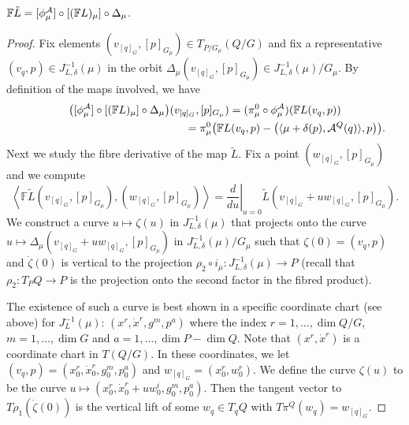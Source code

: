 \documentclass[pdftex]{sigma}
\newcommand{\A}{{\cal A}}
\newcommand{\F}{\mathbb{F}}
\begin{document}
\begin{lemma}\label{lem:legendre}
  $\F \tilde L=[\phi^\A_\mu]\circ[(\F L)_\mu]\circ\Delta_\mu$.
\end{lemma}
\begin{proof}
Fix elements $(v_{[q]_G},[p]_{G_\mu})\in T_{P/G_\mu}(Q/G)$ and f\/ix a representative $(v_q,p)\in J^{-1}_{L,\delta}(\mu)$ in the orbit $\Delta_\mu(v_{[q]_G},[p]_{G_\mu})\in J^{-1}_{L,\delta}(\mu)/G_\mu$. By def\/inition of the maps involved, we have
\begin{gather*}
\big([\phi^\A_\mu]\circ[(\F L)_\mu]\circ\Delta_\mu\big)(v_{[q]_G},[p]_{G_\mu})   = (\pi^0_\mu \circ \phi^\A_\mu)(\F L(v_q,p))\\
 \phantom{\big([\phi^\A_\mu]\circ[(\F L)_\mu]\circ\Delta_\mu\big)(v_{[q]_G},[p]_{G_\mu})}{}
 = \pi^0_\mu\big(\F L(v_q,p)-\big(\langle \mu+\delta(p),\A^Q(q)\rangle,p\big)\big).
\end{gather*}
Next we study the f\/ibre derivative of the map $\tilde L$.  Fix a point $(w_{[q]_G},[p]_{G_\mu})$ and we compute
\[
\left\langle \F\tilde L (v_{[q]_G},[p]_{G_\mu}) , (w_{[q]_G},[p]_{G_\mu})\right\rangle=\left. \frac{d}{du}\right|_{u=0}\tilde L (v_{[q]_G}+u w_{[q]_G},[p]_{G_\mu}).
\]
We construct a curve $u\mapsto \zeta(u)$ in $J^{-1}_{L,\delta}(\mu)$ that projects onto the curve $u\mapsto\Delta_\mu(v_{[q]_G}+u w_{[q]_G},[p]_{G_\mu})$ in $J^{-1}_{L,\delta}(\mu)/G_\mu$ such that $\zeta(0)=(v_q,p)$ and $\dot \zeta(0)$ is vertical to the projection $\rho_2\circ i_\mu:J^{-1}_{L,\delta}(\mu)\to P$ (recall that $\rho_2: T_PQ\to P$ is the projection onto the second factor in the f\/ibred product).

The existence of such a curve is best shown in a specif\/ic coordinate chart (see above) for $J^{-1}_L(\mu)$: $(x^r,\dot x^r, g^m,p^a)$  where the index $r=1,\ldots,\dim Q/G$, $m=1,\ldots,\dim G$ and $a=1,\ldots ,\dim P-\dim Q$. Note that $(x^r,\dot x^r)$ is a coordinate chart in $T(Q/G)$.
In these coordinates, we let $(v_q,p)=(x^r_0,\dot x^r_0,g^m_0,p^a_0)$ and $w_{[q]_G}=(x^r_0, w^r_0)$. We def\/ine the curve $\zeta(u)$ to be the curve $u\mapsto (x^r_0,\dot x^r_0+u w^i_0,g^m_0,p^a_0)$. Then the tangent vector to $T\rho_1(\dot \zeta(0))$ is the vertical lift of some $w_q\in T_qQ$ with $T\pi^Q(w_q)=w_{[q]_G}$.


\end{proof}
\end{document}
